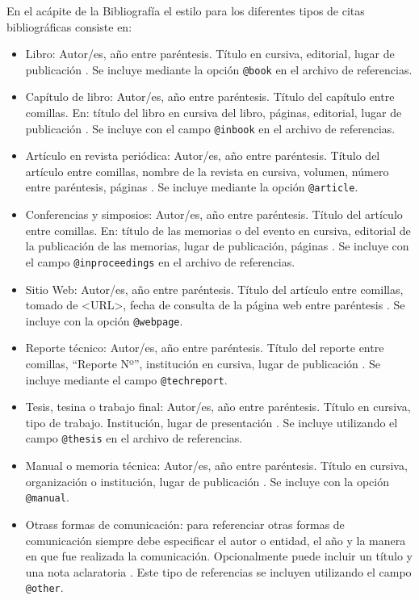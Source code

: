 \documentclass[esp]{FCEFyN-class}
\begin{document}
En el acápite de la Bibliografía el estilo para los diferentes tipos de citas bibliográficas
consiste en:
\begin{itemize}
 \item Libro: Autor/es, año entre paréntesis. Título en cursiva, editorial, lugar de publicación
 \citep{Alarcos1999}. Se incluye mediante la opción \texttt{@book} en el archivo de referencias.
%
 \item Capítulo de libro: Autor/es, año entre paréntesis. Título del capítulo entre comillas.
 En: título del libro en cursiva del libro, páginas, editorial, lugar de publicación
 \citep{Mitchell2001}. Se incluye con el campo \texttt{@inbook} en el archivo de referencias.
%
 \item Artículo en revista periódica: Autor/es, año entre paréntesis. Título del artículo entre
 comillas, nombre de la revista en cursiva, volumen, número entre paréntesis, páginas
 \citep{ArslanHansen1996,WangEtAl2015}. Se incluye mediante la opción \texttt{@article}.
%
 \item Conferencias y simposios: Autor/es, año entre paréntesis. Título del artículo entre comillas.
 En: título de las memorias o del evento en cursiva, editorial de la publicación de las memorias,
 lugar de publicación, páginas \citep{BarkovaJouvet1999}. Se incluye con el campo
 \texttt{@inproceedings} en el archivo de referencias.
%
 \item Sitio Web: Autor/es, año entre paréntesis. Título del artículo entre comillas, tomado de
 <URL>, fecha de consulta de la página web entre paréntesis \citep{CFDwebpage}. Se incluye con la
 opción \texttt{@webpage}.
%
 \item Reporte técnico: Autor/es, año entre paréntesis. Título del reporte entre comillas,
 ``Reporte Nº'', institución en cursiva, lugar de publicación \citep{NACA460}. Se incluye
 mediante el campo \texttt{@techreport}.
%
 \item Tesis, tesina o trabajo final: Autor/es, año entre paréntesis. Título en cursiva, tipo de
 trabajo. Institución, lugar de presentación \citep{Krause2014}. Se incluye utilizando el campo
 \texttt{@thesis} en el archivo de referencias.
%
 \item Manual o memoria técnica: Autor/es, año entre paréntesis. Título en cursiva, organización o
 institución, lugar de publicación \citep{Indura2010}. Se incluye con la opción \texttt{@manual}.
%
 \item Otrass formas de comunicación: para referenciar otras formas de comunicación siempre debe
 especificar el autor o entidad, el año y la manera en que fue realizada la comunicación.
 Opcionalmente puede incluir un título y una nota aclaratoria \citep{Radio2015}. Este tipo de 
 referencias se incluyen utilizando el campo \texttt{@other}.
\end{itemize}
\end{document}
